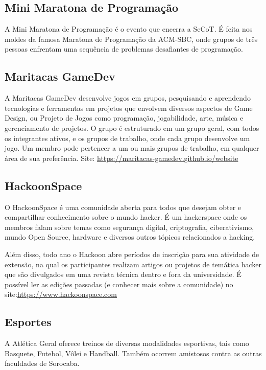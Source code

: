 \subsection{Mini Maratona de Programação}
A Mini Maratona de Programação é o evento que encerra a SeCoT. É feita nos moldes da famosa Maratona de Programação da ACM-SBC, onde grupos de três pessoas enfrentam uma sequência de problemas desafiantes de programação.

\subsection{Maritacas GameDev}
A Maritacas GameDev desenvolve jogos em grupos, pesquisando e aprendendo tecnologias e ferramentas em projetos que envolvem diversos aspectos de Game Design, ou Projeto de Jogos como programação, jogabilidade, arte, música e gerenciamento de projetos. \newline
O grupo é estruturado em um grupo geral, com todos os integrantes ativos, e os grupos de trabalho, onde cada grupo desenvolve um jogo. Um membro pode pertencer a um ou mais grupos de trabalho, em qualquer área de sua preferência.\newline
Site: \url{https://maritacas-gamedev.github.io/website}

\subsection{HackoonSpace}
O HackoonSpace é uma comunidade aberta para todos que desejam obter e compartilhar conhecimento sobre o mundo hacker. É um hackerspace onde os membros falam sobre temas como segurança digital, criptografia, ciberativismo, mundo Open Source, hardware e diversos outros tópicos relacionados a hacking.

Além disso, todo ano o Hackoon abre períodos de inscrição para sua atividade de extensão, na qual os participantes realizam artigos ou projetos de temática hacker que são divulgados em uma revista técnica dentro e fora da universidade. É possível ler as edições passadas (e conhecer mais sobre a comunidade) no site:\newline \url{https://www.hackoonspace.com}

\subsection{Esportes}
A Atlética Geral oferece treinos de diversas modalidades esportivas, tais como Basquete, Futebol, Vôlei e Handball. Também ocorrem amistosos contra as outras faculdades de Sorocaba.

